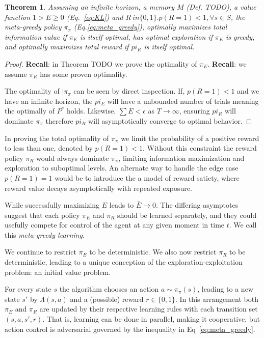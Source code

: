 \documentclass[9pt,twocolumn,twoside]{pnas-new}
\newtheorem{theorem}{Theorem}
\begin{document}
\begin{theorem}
    Assuming an infinite horizon, a memory $M$ (Def. TODO), a value function $1 > E \ge 0$ (Eq.~\ref{eq:KL}) and $R\ in \{0, 1\}. p(R = 1) < 1, \forall s \in S$, the \textit{meta-greedy} policy $\pi_{\pi}$ (Eq.\ref{eq:meta_greedy}), optimally maximizes total information value if $\pi_E$ is itself optimal, has optimal exploration if $\pi_E$ is greedy, and optimally maximizes total reward if $pi_R$ is itself optimal.
\end{theorem}
\begin{proof}
    \textbf{Recall}: in Theorem TODO we prove the optimality of $\pi_E$.
    \textbf{Recall}: we assume $\pi_R$ has some proven optimality.

    The optimality of $|\pi_{\pi}$ can be seen by direct inspection. If, $p(R = 1) < 1$ and we have an infinite horizon, the $pi_E$ will have a unbounded number of trials meaning the optimally of $P^*$ holds. Likewise, $\sum E < \epsilon$ as $T \rightarrow \infty$, ensuring $pi_R$ will dominate $\pi_{\pi}$ therefore $pi_R$ will asymptotically converge to optimal behavior.
\end{proof}

In proving the total optimality of $\pi_{\pi}$ we limit the probability of a positive reward to less than one, denoted by $p(R = 1) < 1$. Without this constraint the reward policy $\pi_R$ would always dominate $\pi_{\pi}$, limiting information maximization and exploration to suboptimal levels. An alternate way to handle the edge case $p(R = 1) = 1$ would be to introduce the a model of reward satiety, where reward value decays asymptotically with repeated exposure. %


While successfully maximizing $E$ leads to $\bar E \rightarrow 0$. The differing asymptotes suggest that each policy $\pi_E$ and $\pi_R$ should be learned separately, and they could usefully compete for control of the agent at any given moment in time $t$. We call this \textit{meta-greedy learning}.

We continue to restrict $\pi_E$ to be deterministic. We also now restrict $\pi_R$ to be deterministic, leading to a unique conception of the exploration-exploitation problem: an initial value problem. 

For every state $s$ the algorithm chooses an action $a \sim \pi_{\pi}(s)$, leading to a new state $s'$ by $\Lambda(s, a)$ and a (possible) reward $r \in \{0,1\}$. In this arrangement both $\pi_E$ and $\pi_R$ are updated by their respective learning rules with each transition set $(s, a, s', r)$. That is, learning can be done in parallel, making it cooperative, but action control is adversarial governed by the inequality in Eq~\ref{eq:meta_greedy}.
\end{document}
